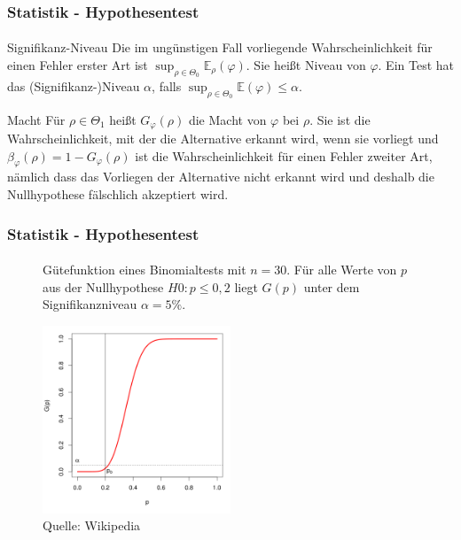 \documentclass{beamer}
\begin{document}
\begin{frame}
    \frametitle{Statistik - Hypothesentest}
\framesubtitle{}
\begin{block}{Signifikanz-Niveau}
Die im ungünstigen Fall vorliegende Wahrscheinlichkeit für einen Fehler erster Art ist $\sup_{\rho \in \Theta_0} \mathbb{E}_{\rho}(\varphi)$. Sie heißt Niveau von $\varphi$.  Ein Test hat das (Signifikanz-)Niveau $\alpha$, falls  $\sup_{\rho \in \Theta_0} \mathbb{E}(\varphi) \leq \alpha$.
\end{block}
\begin{block}{Macht}
Für $\rho \in \Theta_1$ heißt  $ G_{\varphi}(\rho)$ die Macht von $\varphi$ bei $\rho$. Sie ist die Wahrscheinlichkeit, mit der die Alternative erkannt wird, wenn sie vorliegt und $\beta_{\varphi}(\rho) = 1 - G_{\varphi}(\rho)$ ist die Wahrscheinlichkeit für einen Fehler zweiter Art, nämlich dass das Vorliegen der Alternative nicht erkannt wird und deshalb die Nullhypothese fälschlich akzeptiert wird.
\end{block}
 \end{frame}

\begin{frame}
    \frametitle{Statistik - Hypothesentest}
\framesubtitle{}

\begin{figure}[htp]
      \centering
Gütefunktion eines Binomialtests mit $n = 30$. Für alle Werte von $p$ aus der Nullhypothese $H0: p \leq 0,2$ liegt $G(p)$ unter dem Signifikanzniveau $\alpha = 5 \%$.

      \centering
    \includegraphics[width=0.5\textwidth]{img/Power_function_binomial_test}
\caption{Quelle: Wikipedia}
\end{figure}

 \end{frame}
\end{document}
